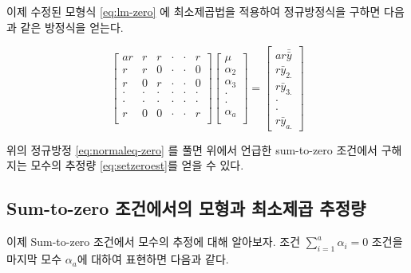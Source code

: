 \documentclass[
]{book}
\theoremstyle{definition}
\theoremstyle{definition}
\theoremstyle{definition}
\theoremstyle{definition}
\theoremstyle{remark}
\begin{document}
이제 수정된 모형식 \eqref{eq:lm-zero} 에 최소제곱법을 적용하여 정규방정식을 구하면 다음과 같은 방정식을 얻는다.

\begin{equation}
\begin{bmatrix}
ar   & r & r & \cdot & \cdot & r \\
r & r &  0  & \cdot & \cdot & 0 \\
r & 0   & r  & \cdot & \cdot & 0 \\
\cdot & \cdot   & \cdot  & \cdot & \cdot & \cdot \\
\cdot & \cdot   & \cdot  & \cdot & \cdot & \cdot \\
r & 0   &  0   & \cdot & \cdot & r \\
\end{bmatrix}
\begin{bmatrix}
\mu \\
\alpha_{2} \\
\alpha_{3} \\
\cdot \\
\cdot \\
\alpha_{a} \\
\end{bmatrix}
=
\begin{bmatrix}
ar \bar {\bar y} \\
r {\bar y}_{2.}\\
r \bar y_{3.}\\
\cdot \\
\cdot \\
r \bar y_{a.}
\end{bmatrix}
\label{eq:normaleq-zero}
\end{equation}

위의 정규방정 \eqref{eq:normaleq-zero} 를 풀면 위에서 언급한 sum-to-zero 조건에서 구해지는 모수의 추정량 \eqref{eq:setzeroest}를 얻을 수 있다.

\hypertarget{sum-to-zero-uxc870uxac74uxc5d0uxc11cuxc758-uxbaa8uxd615uxacfc-uxcd5cuxc18cuxc81cuxacf1-uxcd94uxc815uxb7c9}{%
\subsection{Sum-to-zero 조건에서의 모형과 최소제곱 추정량}\label{sum-to-zero-uxc870uxac74uxc5d0uxc11cuxc758-uxbaa8uxd615uxacfc-uxcd5cuxc18cuxc81cuxacf1-uxcd94uxc815uxb7c9}}

이제 Sum-to-zero 조건에서 모수의 추정에 대해 알아보자. 조건 \(\sum_{i=1}^a \alpha_i =0\) 조건을 마지막 모수 \(\alpha_a\)에 대하여 표현하면 다음과 같다.
\end{document}
